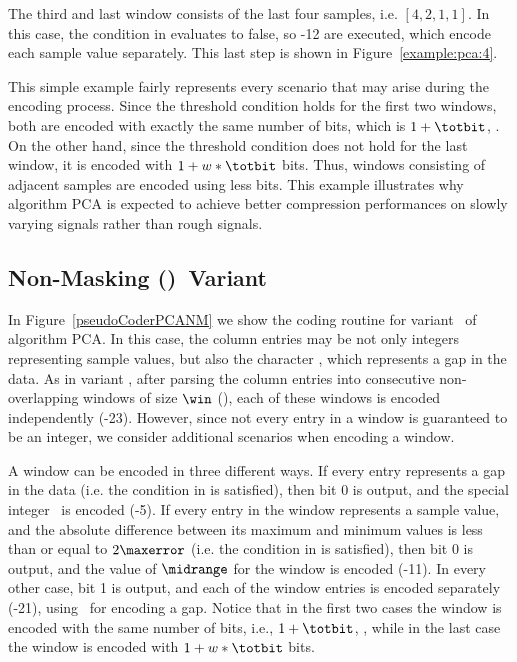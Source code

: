\vspace{-10pt}
The third and last window consists of the last four samples, i.e. $[4, 2, 1, 1]$. In this case, the condition in  evaluates to false, so -12 are executed, which encode each sample value separately. This last step is shown in Figure~\ref{example:pca:4}.




\vspace{-10pt}
This simple example fairly represents every scenario that may arise during the encoding process. Since the threshold condition holds for the first two windows, both are encoded with exactly the same number of bits, which is $1 + \totbit$, \wheretotbit. On the other hand, since the threshold condition does not hold for the last window, it is encoded with $1 + w*\totbit$ bits. Thus, windows consisting of adjacent samples are encoded using less bits. This example illustrates why algorithm PCA is expected to achieve better compression performances on slowly varying signals rather than rough signals.




\subsection{Non-Masking (\NOmaskalgo)\ Variant}
\label{algo:pca:nmvariant}


In Figure~\ref{pseudoCoderPCANM} we show the coding routine for variant \NOmaskalgo\ of algorithm PCA. In this case, the column entries may be not only integers representing sample values, but also the character \noData, which represents a gap in the data. As in variant \maskalgo, after parsing the column entries into consecutive non-overlapping windows of size $\win$ (), each of these windows is encoded independently (-23). However, since not every entry in a window is guaranteed to be an integer, we consider additional scenarios when encoding a window.





A window can be encoded in three different ways. If every entry represents a gap in the data (i.e. the condition in  is satisfied), then bit 0 is output, and the special integer \nodata\ is encoded (-5). If every entry in the window represents a sample value, and the absolute difference between its maximum and minimum values is less than or equal to $2\maxerror$ (i.e. the condition in  is satisfied), then bit 0 is output, and the value of $\midrange$ for the window is encoded (-11). In every other case, bit 1 is output, and each of the window entries is encoded separately (-21), using \nodata\ for encoding a gap. Notice that in the first two cases the window is encoded with the same number of bits, i.e., $1 + \totbit$, \wheretotbit, while in the last case the window is encoded with $1 + w*\totbit$ bits.


